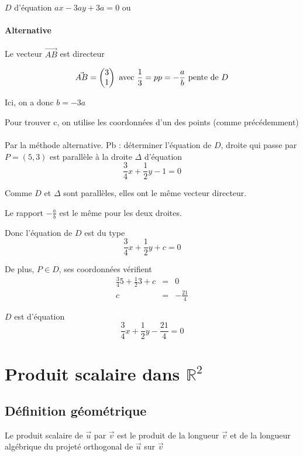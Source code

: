 $D$ d'équation $ax -3ay + 3a = 0$ ou 

\paragraph{Alternative}

Le vecteur $\vec{AB}$ est directeur

\[\vec{AB} = \begin{pmatrix}
3 \\
1
\end{pmatrix} \text{ avec } \frac{1}{3} = p
~\\
p = -\frac{a}{b} \text{ pente de  }D\]

Ici, on a donc $b = -3a$

Pour trouver c, on utilise les coordonnées d'un des points (comme précédemment)

\paragraph{} Par la méthode alternative.
Pb : déterminer l'équation de $D$, droite qui passe par $P = (5, 3)$ est parallèle à la droite $\Delta$ d'équation \[\frac{3}{4}x + \frac{1}{2}y -1=0\]

Comme $D$ et $\Delta$ sont parallèles, elles ont le même vecteur directeur. 

Le rapport $-\frac{a}{b}$ est le même pour les deux droites.

Donc l'équation de $D$ est du type \[\frac{3}{4}x + \frac{1}{2}y + c = 0\]

De plus, $P \in D$, ses coordonnées vérifient
\[\begin{array}{rcl}
	\frac{3}{4}5 + \frac{1}{2}3 + c &=& 0 \\
	c &=& -\frac{21}{4} \end{array}\]

$D$ est d'équation \[\frac{3}{4}x + \frac{1}{2}y - \frac{21}{4} = 0\]

\section{Produit scalaire dans $\mathbb{R}^2$}

\subsection{Définition géométrique}
\begin{wrapfigure}[5]{r}{0pt}
\end{wrapfigure}
	Le produit scalaire de $\vec{u}$ par $\vec{v}$ est le produit de la longueur $\vec{v}$ et de la longueur algébrique du projeté orthogonal de $\vec{u}$ sur $\vec{v}$

